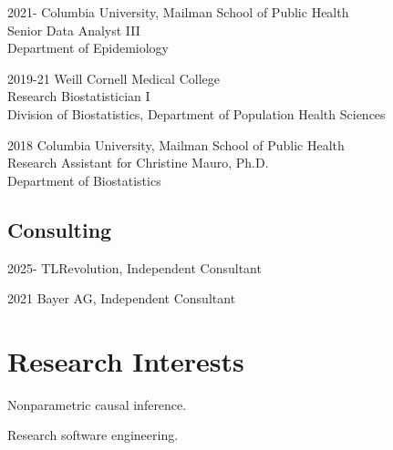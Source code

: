 \documentclass[12pt,letterpaper]{report}
\newcommand{\listitemspace}{0.15em}
\renewenvironment{itemize}
{\begin{list}{}{\setlength{\leftmargin}{0em}
            \setlength{\parskip}{0em}
            \setlength{\itemsep}{\listitemspace}
            \setlength{\parsep}{\listitemspace}}}
    {\end{list}}
\begin{document}
    \begin{tablist}
    
    	\item[2021-] \tab Columbia University, Mailman School of Public Health \\
						  Senior Data Analyst III \\
						  Department of Epidemiology

        \item[2019-21] \tab Weill Cornell Medical College \\
                            Research Biostatistician I  \\
                            Division of Biostatistics, Department of Population Health Sciences 
        
        \item[2018]  \tab Columbia University, Mailman School of Public Health \\
                          Research Assistant for Christine Mauro, Ph.D. \\
                          Department of Biostatistics

    \end{tablist}
    
    \subsection*{Consulting}
    
    \begin{tablist}
    
	\item[2025-] \tab TLRevolution, Independent Consultant
						  
	\item[2021] \tab Bayer AG, Independent Consultant
    
    \end{tablist}

    \section*{Research Interests}

    \begin{itemize}

        \item Nonparametric causal inference.

        \item Research software engineering.

    \end{itemize}
\end{document}
